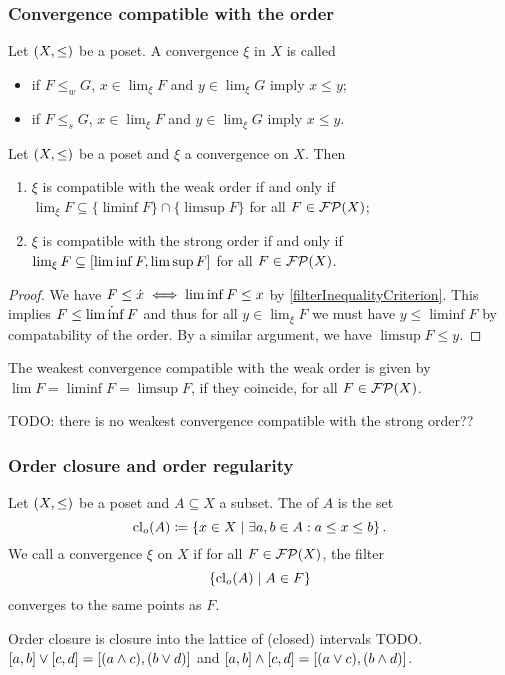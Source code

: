 \subsubsection{Convergence compatible with the order}
\begin{definition}
Let $\left( X,\leq \right)$ be a poset. A convergence $\xi$ in $X$ is called
\begin{itemize}
\item {} if $F \leq_w G$, $x\in\lim_\xi F$ and $y\in \lim_\xi G$ imply $x\leq y$;
\item {} if $F \leq_s G$, $x\in\lim_\xi F$ and $y\in \lim_\xi G$ imply $x\leq y$.
\end{itemize}
\end{definition}


\begin{lemma}
Let $\left( X,\leq \right)$ be a poset and $\xi$ a convergence on $X$. Then
\begin{enumerate}
\item $\xi$ is compatible with the weak order \textup{if and only if} $\lim_\xi F\subseteq \{\liminf F\}\cap\{\limsup F\}$ for all $F\in\operatorname{\mathcal{FP}}(X)$;
\item $\xi$ is compatible with the strong order \textup{if and only if} $\lim_\xi F\subseteq \interval{\liminf F, \limsup F}$ for all $F\in\operatorname{\mathcal{FP}}(X)$.
\end{enumerate}
\end{lemma}
\begin{proof}
We have $F \leq \dot{x} \iff \liminf F \leq x$ by \ref{filterInequalityCriterion}. This implies 
$F \leq \dot{\liminf F}$ and thus for all $y\in\lim_\xi F$ we must have $y\leq \liminf F$ by compatability of the order. By a similar argument, we have $\limsup F \leq y$.
\end{proof}
\begin{corollary} \mbox{}
The weakest convergence compatible with the weak order is given by $\lim F = \liminf F =\limsup F$, if they coincide, for all $F\in \operatorname{\mathcal{FP}}(X)$.
\end{corollary}
TODO: there is no weakest convergence compatible with the strong order??

\subsubsection{Order closure and order regularity}
\begin{definition}
Let $\left( X, \leq \right)$ be a poset and $A\subseteq X$ a subset. The  of $A$ is the set
\[ \operatorname{cl}_o(A) \coloneqq \left\{ x\in X \;\middle|\; \exists a,b\in A: a\leq x\leq b \right\}. \]
We call a convergence $\xi$ on $X$  if for all $F\in \operatorname{\mathcal{FP}}(X)$, the filter
\[ \left\{ \operatorname{cl}_o(A) \;\middle|\; A\in F \right\} \]
converges to the same points as $F$.
\end{definition}
Order closure is closure into the lattice of (closed) intervals TODO. $\interval{a,b}\vee \interval{c,d} = \interval{(a\wedge c), (b\vee d)}$ and $\interval{a,b}\wedge \interval{c,d} = \interval{(a\vee c), (b\wedge d)}$.


